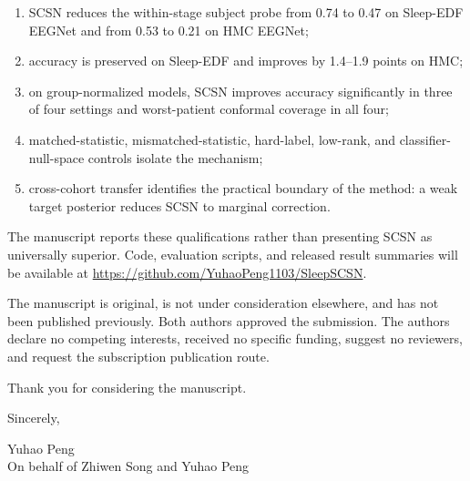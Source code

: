 \documentclass[10pt]{letter}
\begin{document}
\begin{enumerate}[leftmargin=1.2em,itemsep=0.08em,topsep=0.2em]
\item SCSN reduces the within-stage subject probe from 0.74 to 0.47 on
Sleep-EDF EEGNet and from 0.53 to 0.21 on HMC EEGNet;
\item accuracy is preserved on Sleep-EDF and improves by 1.4--1.9 points on
HMC;
\item on group-normalized models, SCSN improves accuracy significantly in
three of four settings and worst-patient conformal coverage in all four;
\item matched-statistic, mismatched-statistic, hard-label, low-rank, and
classifier-null-space controls isolate the mechanism;
\item cross-cohort transfer identifies the practical boundary of the method:
a weak target posterior reduces SCSN to marginal correction.
\end{enumerate}

The manuscript reports these qualifications rather than presenting SCSN as
universally superior. Code, evaluation scripts, and released result summaries
will be available at \url{https://github.com/YuhaoPeng1103/SleepSCSN}.

The manuscript is original, is not under consideration elsewhere, and has not
been published previously. Both authors approved the submission. The authors
declare no competing interests, received no specific funding, suggest no
reviewers, and request the subscription publication route.

Thank you for considering the manuscript.

\vspace{0.8em}
Sincerely,

\vspace{0.8em}
Yuhao Peng\\
On behalf of Zhiwen Song and Yuhao Peng
\end{document}
